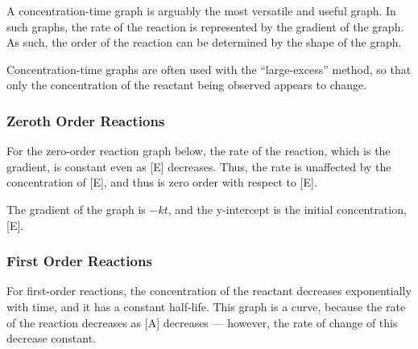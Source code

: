 			A concentration-time graph is arguably the most versatile and useful graph. In such graphs, the rate of the reaction is represented
			by the gradient of the graph. As such, the order of the reaction can be determined by the shape of the graph.

			Concentration-time graphs are often used with the ``large-excess'' method, so that only the concentration of the reactant being
			observed appears to change.


			\subsubsection{Zeroth Order Reactions}

				For the zero-order reaction graph below, the rate of the reaction, which is the gradient, is constant even as [E] decreases.
				Thus, the rate is unaffected by the concentration of [E], and thus is zero order with respect to [E].

				\begin{center}
				\end{center}

				The gradient of the graph is $-kt$, and the y-intercept is the initial concentration, [E].





			\pagebreak
			\subsubsection{First Order Reactions}

				For first-order reactions, the concentration of the reactant decreases exponentially with time, and it has a constant half-life.
				This graph is a curve, because the rate of the reaction decreases as [A] decreases --- however, the rate of change of this
				decrease constant.


